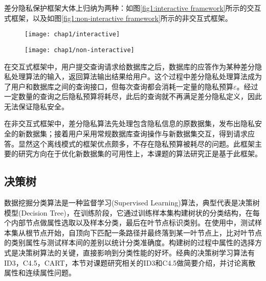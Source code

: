 差分隐私保护框架大体上归纳为两种：如图\ref{fig1:interactive framework}所示的交互式框架，以及如图\ref{fig1:non-interactive framework}所示的非交互式框架。

\begin{figure}[!htp]
	\centering
	\texttt{[image: chap1/interactive]}
\end{figure}

\begin{figure}[!htp]
	\centering
	\texttt{[image: chap1/non-interactive]}
\end{figure}

在交互式框架中，用户提交查询请求给数据库之后，数据库的应答作为某种差分隐私处理算法的输入，返回算法输出结果给用户\supercite{interactive}。这个过程中差分隐私处理算法成为了用户和数据库之间的查询接口，但每次查询都会消耗一定量的隐私预算$\varepsilon$。经过一定数量的查询之后隐私预算将耗尽，此后的查询就不再满足差分隐私定义，因此无法保证隐私安全。

在非交互式框架中，差分隐私算法先处理包含隐私信息的原数据集，发布出隐私安全的新数据集；接着用户采用常规数据库查询操作与新数据集交互，得到请求应答\supercite{non-interactive}。显然这个离线模式的框架优点颇多，不存在隐私预算被耗尽的问题。此框架主要的研究方向在于优化新数据集的可用性上，本课题的算法研究正是基于此框架。


\subsection{决策树} %
\label{chap1_decisicon_tree}
数据挖掘分类算法是一种监督学习(Supervised Learning)算法，典型代表是决策树模型(Decision Tree)\supercite{decision-tree}，在训练阶段，它通过训练样本集构建树状的分类结构，在每个内部节点做属性选取以及样本分类，最后在叶节点标识类别。在使用中，测试样本集从根节点开始，自顶向下匹配一条路径并最终落到某一叶节点上，比对叶节点的类别属性与测试样本间的差别以统计分类准确度。构建树的过程中属性的选择方式是决策树算法的关键，直接影响到分类性能的好坏。经典的决策树学习算法有ID3\supercite{decision-tree}，C4.5\supercite{c45}，CART\supercite{cart}，本节对课题研究相关的ID3和C4.5做简要介绍，并讨论离散属性和连续属性问题。

